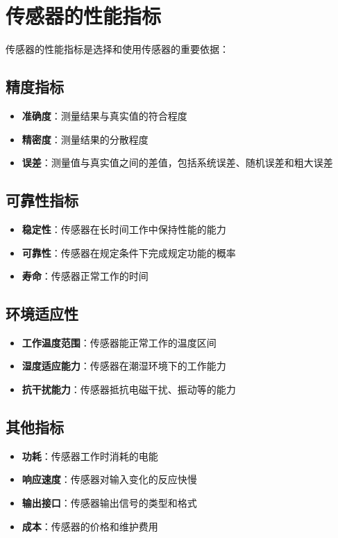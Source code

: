 \documentclass[12pt,UTF8]{ctexbook}
\begin{document}
\section{传感器的性能指标}

传感器的性能指标是选择和使用传感器的重要依据：

\subsection{精度指标}

\begin{itemize}[leftmargin=2cm]
	\item \textbf{准确度}：测量结果与真实值的符合程度
	\item \textbf{精密度}：测量结果的分散程度
	\item \textbf{误差}：测量值与真实值之间的差值，包括系统误差、随机误差和粗大误差
\end{itemize}

\subsection{可靠性指标}

\begin{itemize}[leftmargin=2cm]
	\item \textbf{稳定性}：传感器在长时间工作中保持性能的能力
	\item \textbf{可靠性}：传感器在规定条件下完成规定功能的概率
	\item \textbf{寿命}：传感器正常工作的时间
\end{itemize}

\subsection{环境适应性}

\begin{itemize}[leftmargin=2cm]
	\item \textbf{工作温度范围}：传感器能正常工作的温度区间
	\item \textbf{湿度适应能力}：传感器在潮湿环境下的工作能力
	\item \textbf{抗干扰能力}：传感器抵抗电磁干扰、振动等的能力
\end{itemize}

\subsection{其他指标}

\begin{itemize}[leftmargin=2cm]
	\item \textbf{功耗}：传感器工作时消耗的电能
	\item \textbf{响应速度}：传感器对输入变化的反应快慢
	\item \textbf{输出接口}：传感器输出信号的类型和格式
	\item \textbf{成本}：传感器的价格和维护费用
\end{itemize}
\end{document}
